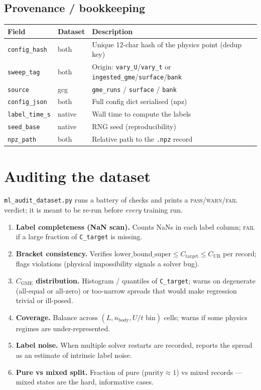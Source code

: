\documentclass[11pt]{article}
\newcommand{\code}[1]{\texttt{\small #1}}
\newcommand{\CGME}{\ensuremath{C_{\mathrm{GME}}}}
\begin{document}
\subsection{Provenance / bookkeeping}
\begin{longtable}{@{}p{2.4cm}p{1.6cm}p{9.3cm}@{}}
\toprule
Field & Dataset & Description \\ \midrule \endhead
\code{config\_hash} & both   & Unique 12-char hash of the physics point (dedup key) \\
\code{sweep\_tag}   & both   & Origin: \code{vary\_U}/\code{vary\_t} or \code{ingested\_gme}/\code{surface}/\code{bank} \\
\code{source}       & gcg    & \code{gme\_runs} / \code{surface} / \code{bank} \\
\code{config\_json} & both   & Full config dict serialised (npz) \\
\code{label\_time\_s} & native & Wall time to compute the labels \\
\code{seed\_base}   & native & RNG seed (reproducibility) \\
\code{npz\_path}    & both   & Relative path to the \code{.npz} record \\
\bottomrule
\end{longtable}

\section{Auditing the dataset}\label{sec:audit}
\code{ml\_audit\_dataset.py} runs a battery of checks and prints a
\textsc{pass}/\textsc{warn}/\textsc{fail} verdict; it is meant to be re-run
before \emph{every} training run.
\begin{enumerate}[nosep]
  \item \textbf{Label completeness (NaN scan).} Counts NaNs in each label column;
        \textsc{fail} if a large fraction of \code{C\_target} is missing.
  \item \textbf{Bracket consistency.} Verifies
        $\text{lower\_bound\_super}\le C_{\text{target}}\le C_{\text{UB}}$ per record;
        flags violations (physical impossibility signals a solver bug).
  \item \textbf{\CGME{} distribution.} Histogram / quantiles of \code{C\_target};
        warns on degenerate (all-equal or all-zero) or too-narrow spreads that
        would make regression trivial or ill-posed.
  \item \textbf{Coverage.} Balance across $(L, n_{\text{body}}, U/t\text{ bin})$
        cells; warns if some physics regimes are under-represented.
  \item \textbf{Label noise.} When multiple solver restarts are recorded, reports
        the spread as an estimate of intrinsic label noise.
  \item \textbf{Pure vs mixed split.} Fraction of pure ($\text{purity}\approx1$)
        vs mixed records --- mixed states are the hard, informative cases.
\end{enumerate}
\end{document}
